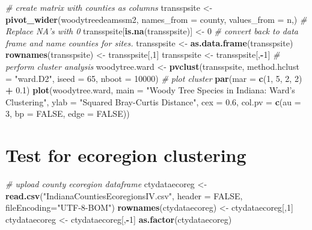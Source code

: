 \documentclass[
]{article}
\newenvironment{Shaded}{\begin{snugshade}}{\end{snugshade}}
\newcommand{\CommentTok}[1]{\textcolor[rgb]{0.56,0.35,0.01}{\textit{#1}}}
\newcommand{\DataTypeTok}[1]{\textcolor[rgb]{0.13,0.29,0.53}{#1}}
\newcommand{\DecValTok}[1]{\textcolor[rgb]{0.00,0.00,0.81}{#1}}
\newcommand{\FloatTok}[1]{\textcolor[rgb]{0.00,0.00,0.81}{#1}}
\newcommand{\KeywordTok}[1]{\textcolor[rgb]{0.13,0.29,0.53}{\textbf{#1}}}
\newcommand{\NormalTok}[1]{#1}
\newcommand{\OperatorTok}[1]{\textcolor[rgb]{0.81,0.36,0.00}{\textbf{#1}}}
\newcommand{\OtherTok}[1]{\textcolor[rgb]{0.56,0.35,0.01}{#1}}
\newcommand{\StringTok}[1]{\textcolor[rgb]{0.31,0.60,0.02}{#1}}
\begin{document}
\begin{Shaded}
\begin{Highlighting}[]
\CommentTok{# create matrix with counties as columns}
\NormalTok{transspsite <-}\StringTok{ }\KeywordTok{pivot_wider}\NormalTok{(woodytreedeamssm2, }\DataTypeTok{names_from =}\NormalTok{ county, }\DataTypeTok{values_from =}\NormalTok{ n,)}
\CommentTok{# Replace NA's with 0}
\NormalTok{transspsite[}\KeywordTok{is.na}\NormalTok{(transspsite)] <-}\StringTok{ }\DecValTok{0}
\CommentTok{# convert back to data frame and name counties for sites. }
\NormalTok{transspsite <-}\StringTok{ }\KeywordTok{as.data.frame}\NormalTok{(transspsite)}
\KeywordTok{rownames}\NormalTok{(transspsite) <-}\StringTok{ }\NormalTok{transspsite[,}\DecValTok{1}\NormalTok{]}
\NormalTok{transspsite <-}\StringTok{ }\NormalTok{transspsite[,}\OperatorTok{-}\DecValTok{1}\NormalTok{]}
\CommentTok{# perform cluster analysis}
\NormalTok{woodytree.ward <-}\StringTok{ }\KeywordTok{pvclust}\NormalTok{(transspsite, }\DataTypeTok{method.hclust =} \StringTok{"ward.D2"}\NormalTok{, }\DataTypeTok{iseed =} \DecValTok{65}\NormalTok{, }\DataTypeTok{nboot =} \DecValTok{10000}\NormalTok{)}
\CommentTok{# plot cluster}
\KeywordTok{par}\NormalTok{(}\DataTypeTok{mar =} \KeywordTok{c}\NormalTok{(}\DecValTok{1}\NormalTok{, }\DecValTok{5}\NormalTok{, }\DecValTok{2}\NormalTok{, }\DecValTok{2}\NormalTok{) }\OperatorTok{+}\StringTok{ }\FloatTok{0.1}\NormalTok{)}
\KeywordTok{plot}\NormalTok{(woodytree.ward, }\DataTypeTok{main =} \StringTok{"Woody Tree Species in Indiana: Ward's Clustering"}\NormalTok{, }\DataTypeTok{ylab =} \StringTok{"Squared Bray-Curtis Distance"}\NormalTok{, }\DataTypeTok{cex =} \FloatTok{0.6}\NormalTok{, }\DataTypeTok{col.pv =} \KeywordTok{c}\NormalTok{(}\DataTypeTok{au =} \DecValTok{3}\NormalTok{, }\DataTypeTok{bp =} \OtherTok{FALSE}\NormalTok{, }\DataTypeTok{edge =} \OtherTok{FALSE}\NormalTok{))}
\end{Highlighting}
\end{Shaded}

\hypertarget{test-for-ecoregion-clustering}{%
\section{Test for ecoregion
clustering}\label{test-for-ecoregion-clustering}}

\begin{Shaded}
\begin{Highlighting}[]
\CommentTok{# upload county ecoregion dataframe}
\NormalTok{ctydataecoreg <-}\StringTok{ }\KeywordTok{read.csv}\NormalTok{(}\StringTok{"IndianaCountiesEcoregionsIV.csv"}\NormalTok{, }\DataTypeTok{header =} \OtherTok{FALSE}\NormalTok{, }\DataTypeTok{fileEncoding=}\StringTok{"UTF-8-BOM"}\NormalTok{)}
\KeywordTok{rownames}\NormalTok{(ctydataecoreg) <-}\StringTok{ }\NormalTok{ctydataecoreg[,}\DecValTok{1}\NormalTok{]}
\NormalTok{ctydataecoreg <-}\StringTok{ }\NormalTok{ctydataecoreg[,}\OperatorTok{-}\DecValTok{1}\NormalTok{]}
\KeywordTok{as.factor}\NormalTok{(ctydataecoreg)}
\end{Highlighting}
\end{Shaded}
\end{document}
